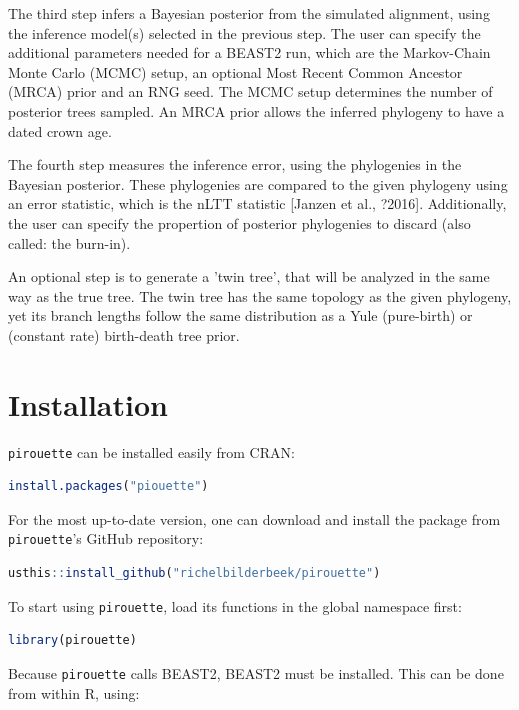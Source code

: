 \documentclass{article}
\begin{document}
The third step infers a Bayesian posterior from the simulated alignment,
using the inference model(s) selected in the previous step. The user
can specify the additional parameters needed for a BEAST2 run, which
are the Markov-Chain Monte Carlo (MCMC) setup, 
an optional Most Recent Common Ancestor (MRCA) prior and an RNG seed.
The MCMC setup determines the number of posterior trees sampled.
An MRCA prior allows the inferred phylogeny to have a dated crown age.

The fourth step measures the inference error, using the phylogenies in the
Bayesian posterior. These phylogenies are compared to the given
phylogeny using an error statistic, which is the nLTT 
statistic [Janzen et al., ?2016]. Additionally, the user can specify the
propertion of posterior phylogenies to discard (also called: the burn-in).

An optional step is to generate a 'twin tree', that will be
analyzed in the same way as the true tree. The twin tree has the same
topology as the given phylogeny, yet its branch lengths follow the same
distribution as a Yule (pure-birth) or (constant rate) birth-death tree prior.

\section{Installation}

\verb;pirouette; can be installed easily from CRAN:

\begin{lstlisting}[language=R, floatplacement=H]
install.packages("piouette")
\end{lstlisting}

For the most up-to-date version, 
one can download and install the package from \verb;pirouette;'s GitHub repository:

\begin{lstlisting}[language=R, floatplacement=H]
usthis::install_github("richelbilderbeek/pirouette")
\end{lstlisting}
To start using \verb;pirouette;, load its functions in the global namespace first:

\begin{lstlisting}[language=R, floatplacement=H]
library(pirouette)
\end{lstlisting}
Because \verb;pirouette; calls BEAST2, BEAST2 must be installed. 
This can be done from within R, using:
\end{document}
